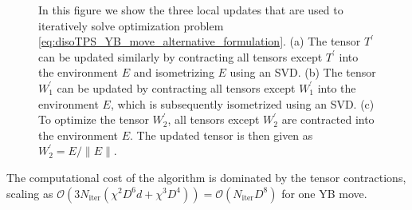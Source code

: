 \begin{figure}
\begin{subfigure}[c]{0.85\textwidth}
		\caption{}\label{fig:YB_move_iterate_polar_optimize_W2}
	\end{subfigure}%
	\caption{In this figure we show the three local updates that are used to iteratively solve optimization problem \eqref{eq:disoTPS_YB_move_alternative_formulation}. (a) The tensor $T^\prime$ can be updated similarly by contracting all tensors except $T^\prime$ into the environment $E$ and isometrizing $E$ using an SVD. (b) The tensor $W_1^\prime$ can be updated by contracting all tensors except $W_1^\prime$ into the environment $E$, which is subsequently isometrized using an SVD. (c) To optimize the tensor $W_2^\prime$, all tensors except $W_2^\prime$ are contracted into the environment $E$. The updated tensor is then given as $W_2^\prime = E/\lVert E\rVert$.}
	\label{fig:YB_move_iterate_polar}
\end{figure}
The computational cost of the algorithm is dominated by the tensor contractions, scaling as $\mathcal{O}(3N_\text{iter}(\chi^2D^6d + \chi^3D^4)) = \mathcal{O}(N_\text{iter}D^8)$ for one YB move.
